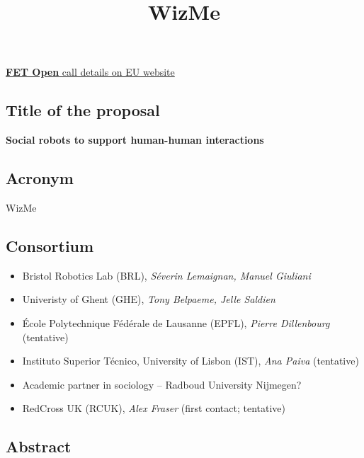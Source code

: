 \documentclass[]{article}
\title{WizMe}
\date{}
\providecommand{\tightlist}{%
  \setlength{\itemsep}{0pt}\setlength{\parskip}{0pt}}
\begin{document}
\maketitle

\href{https://ec.europa.eu/info/funding-tenders/opportunities/portal/screen/opportunities/topic-details/fetopen-01-2018-2019-2020;freeTextSearchKeyword=;typeCodes=1;statusCodes=31094501,31094502;programCode=null;programDivisionCode=null;focusAreaCode=null;crossCuttingPriorityCode=null;callCode=31088571;sortQuery=openingDate;onlyTenders=false}{\textbf{FET
Open} call details on EU website}

\hypertarget{title-of-the-proposal}{%
\subsection{Title of the proposal}\label{title-of-the-proposal}}

\textbf{Social robots to support human-human interactions}

\hypertarget{acronym}{%
\subsection{Acronym}\label{acronym}}

WizMe

\hypertarget{consortium}{%
\subsection{Consortium}\label{consortium}}

\begin{itemize}
\tightlist
\item
  Bristol Robotics Lab (BRL), \emph{Séverin Lemaignan, Manuel Giuliani}
\item
  Univeristy of Ghent (GHE), \emph{Tony Belpaeme, Jelle Saldien}
\item
  École Polytechnique Fédérale de Lausanne (EPFL), \emph{Pierre
  Dillenbourg} (tentative)
\item
  Instituto Superior Técnico, University of Lisbon (IST), \emph{Ana
  Paiva} (tentative)
\item
  Academic partner in sociology -- Radboud University Nijmegen?
\item
  RedCross UK (RCUK), \emph{Alex Fraser} (first contact; tentative)
\end{itemize}

\hypertarget{abstract}{%
\subsection{Abstract}\label{abstract}}
\end{document}
